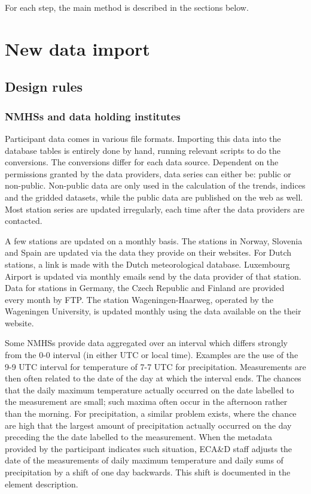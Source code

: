 \documentclass[a4paper,11pt]{article}
\begin{document}
For each step, the main method is described in the sections below. 


\section{New data import}
\subsection{Design rules}
\label{sec:data:design}

\subsubsection{NMHSs and data holding institutes}
\label{sec:data:design:NMHS}
Participant data comes in various file formats. Importing this data
into the database tables is entirely done by hand, running relevant
scripts to do the conversions. The conversions differ for each data
source. Dependent on the permissions granted by the data providers,
data series can either be: public or non-public. Non-public data are
only used in the calculation of the trends, indices and the gridded
datasets, while the public data are published on the web as well. Most
station series are updated irregularly, each time after the data
providers are contacted.

A few stations are updated on a monthly basis. The stations in Norway,
Slovenia and Spain are updated via the data they provide on their
websites. For Dutch stations, a link is made with the Dutch
meteorological database. Luxembourg Airport is updated via monthly
emails send by the data provider of that station. Data for stations in
Germany, the Czech Republic and Finland are provided every month by FTP.
The station Wageningen-Haarweg, operated by the Wageningen University, is
updated monthly using the data available on the their website.

Some NMHSs provide data aggregated over an interval which differs
strongly from the 0-0 interval (in either UTC or local time). Examples are
the use of the 9-9 UTC interval for temperature of 7-7 UTC for precipitation. 
Measurements are then often related to the date of the
day at which the interval ends. The chances that the daily maximum temperature actually occurred
on the date labelled to the measurement are small; such maxima often occur in the afternoon
rather than the morning. For precipitation, a similar problem exists, where the chance
are high that the largest amount of precipitation actually occurred on the day preceding
the the date labelled to the measurement. When the metadata provided by the participant
indicates such situation, ECA\&D staff adjusts the date of the measurements of 
daily maximum temperature and daily sums of precipitation by a shift of one day
backwards. This shift is documented in the element description.
\end{document}
